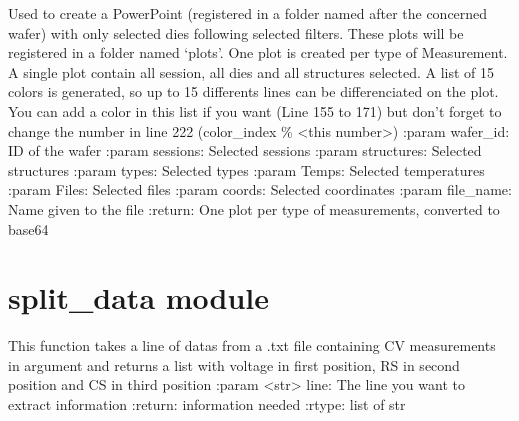 \documentclass[letterpaper,10pt,english]{sphinxmanual}
\begin{document}
\begin{fulllineitems}
\label{\detokenize{plot_and_powerpoint:plot_and_powerpoint.wanted_ppt}}
\pysigstartsignatures
{}
\pysigstopsignatures
\sphinxAtStartPar
Used to create a PowerPoint (registered in a folder named after the concerned wafer) with only selected dies following selected filters. These plots will be registered in a folder named ‘plots’.
One plot is created per type of Measurement.
A single plot contain all session, all dies and all structures selected. A list of 15 colors is generated, so up to 15 differents lines can be differenciated on the plot.
You can add a color in this list if you want (Line 155 to 171) but don’t forget to change the number in line 222 (color\_index \% \textless{}this number\textgreater{})
:param wafer\_id: ID of the wafer
:param sessions: Selected sessions
:param structures: Selected structures
:param types: Selected types
:param Temps: Selected temperatures
:param Files: Selected files
:param coords: Selected coordinates
:param file\_name: Name given to the file
:return: One plot per type of measurements, converted to base64

\end{fulllineitems}


\sphinxstepscope


\section{split\_data module}
\label{\detokenize{split_data:module-split_data}}\label{\detokenize{split_data:split-data-module}}\label{\detokenize{split_data::doc}}

\begin{fulllineitems}
\label{\detokenize{split_data:split_data.C_spliter}}
\pysigstartsignatures
{}
\pysigstopsignatures
\sphinxAtStartPar
This function takes a line of datas from a .txt file containing C\sphinxhyphen{}V measurements in argument and returns a list with voltage in first position, RS in second position and CS in third position
:param \textless{}str\textgreater{} line: The line you want to extract information
:return: information needed
:rtype: list of str

\end{fulllineitems}
\end{document}

